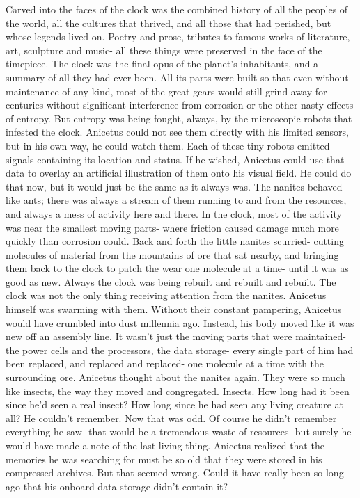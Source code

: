 \documentclass[a4paper]{article}
\begin{document}
Carved into the faces of the clock was the combined history of all the peoples of the world, all the cultures that thrived, and all those that had perished, but whose legends lived on. Poetry and prose, tributes to famous works of literature, art, sculpture and music- all these things were preserved in the face of the timepiece. The clock was the final opus of the planet’s inhabitants, and a summary of all they had ever been.
All its parts were built so that even without maintenance of any kind, most of the great gears would still grind away for centuries without significant interference from corrosion or the other nasty effects of entropy.
But entropy was being fought, always, by the microscopic robots that infested the clock. Anicetus could not see them directly with his limited sensors, but in his own way, he could watch them. Each of these tiny robots emitted signals containing its location and status. If he wished, Anicetus could use that data to overlay an artificial illustration of them onto his visual field. He could do that now, but it would just be the same as it always was.
The nanites behaved like ants; there was always a stream of them running to and from the resources, and always a mess of activity here and there. In the clock, most of the activity was near the smallest moving parts- where friction caused damage much more quickly than corrosion could.
Back and forth the little nanites scurried- cutting molecules of material from the mountains of ore that sat nearby, and bringing them back to the clock to patch the wear one molecule at a time- until it was as good as new. Always the clock was being rebuilt and rebuilt and rebuilt.
The clock was not the only thing receiving attention from the nanites. Anicetus himself was swarming with them. Without their constant pampering, Anicetus would have crumbled into dust millennia ago. Instead, his body moved like it was new off an assembly line. It wasn’t just the moving parts that were maintained- the power cells and the processors, the data storage- every single part of him had been replaced, and replaced and replaced- one molecule at a time with the surrounding ore.
Anicetus thought about the nanites again. They were so much like insects, the way they moved and congregated. Insects. How long had it been since he’d seen a real insect? How long since he had seen any living creature at all? He couldn’t remember. Now that was odd. Of course he didn’t remember everything he saw- that would be a tremendous waste of resources- but surely he would have made a note of the last living thing.
Anicetus realized that the memories he was searching for must be so old that they were stored in his compressed archives. But that seemed wrong. Could it have really been so long ago that his onboard data storage didn’t contain it?
\end{document}

